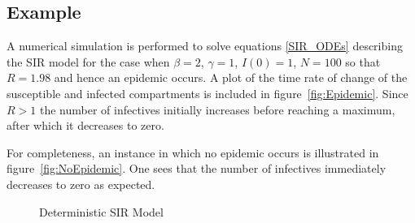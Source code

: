 \documentclass[reqno,11pt]{amsart}
\begin{document}
\subsection{Example} A numerical simulation is performed to solve equations \eqref{SIR_ODEs} describing the SIR model for the case when $\beta = 2$, $ \gamma = 1$, $I(0) = 1$, $N=100$ so that $R = 1.98$ and hence an epidemic occurs. A plot of the time rate of change of the susceptible and infected compartments is included in figure~\ref{fig:Epidemic}. Since $R>1$ the number of infectives initially increases before reaching a maximum, after which it decreases to zero.

For completeness, an instance in which no epidemic occurs is illustrated in figure~\ref{fig:NoEpidemic}. One sees that the number of infectives immediately decreases to zero as expected.

\begin{figure}[ht]
\begin{center}
\caption{Deterministic SIR Model}
\end{center}
\end{figure}
\end{document}
